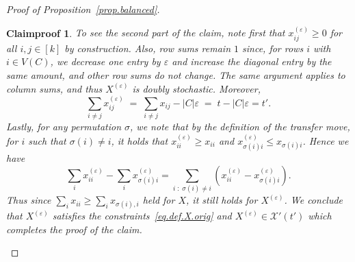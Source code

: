 \documentclass[10pt,a4paper]{amsart}
\newtheorem{claimproof}{Claimproof}
\newcommand{\Fc}{
}
\newcommand{\cX}{\mathcal{X}}
\newcommand{\eps}{\varepsilon}
\begin{document}
\begin{proof}[Proof of Proposition~\ref{prop.balanced}]
\begin{claimproof}
To see the second part of the claim, note first that $x^{(\varepsilon)}_{ij}\ge 0$ for all $i,j\in [k]$ by construction.
Also, row sums remain $1$ since, for rows $i$ with $i\in V(C)$, we decrease one entry by $\eps$ and increase the diagonal
entry by the same amount, and other row sums do not change. The same argument applies to column sums, 
and thus $X^{(\varepsilon)}$ is doubly stochastic. Moreover, 
\[
\sum_{i\neq j} x^{(\varepsilon)}_{ij} \;=\; \sum_{i\neq j} x_{ij} - |C|\varepsilon \;=\; t-|C|\varepsilon=t'.
\]
%
Lastly, for any permutation $\sigma$, {\Fc we note that by the definition of the transfer move, for $i$ such that $\sigma(i)\neq i$, it holds that $x_{ii}^{(\eps)}\geq x_{ii}$ and $x^{(\eps)}_{\sigma(i)i}\leq x_{\sigma(i)i}$. Hence we have
\[\sum_i x^{(\eps)}_{ii}-\sum_{i}x^{(\eps)}_{\sigma(i)i} = \sum_{i \; : \; \sigma(i)\neq i} ( x_{ii}^{(\eps)} - x^{(\eps)}_{\sigma(i)i} ).\]
%
%
 }
%
Thus since $\sum_i x_{ii}\ge \sum_i x_{\sigma(i),i}$ held for $X$, it still holds for $X^{(\varepsilon)}$. We conclude that $X^{(\eps)}$ satisfies the constraints~\eqref{eq.def.X.orig} and $X^{(\eps)}\in \cX'(t')$ which completes the proof of the claim.
\end{claimproof}


\end{proof}
\end{document}

